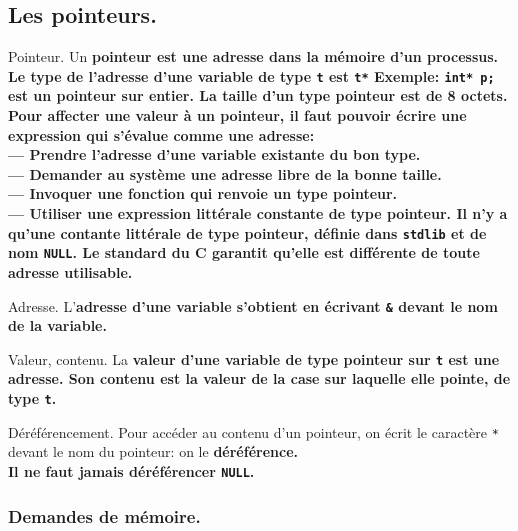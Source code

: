 \documentclass[french, 11pt]{article}
\begin{document}
\subsection{Les pointeurs.}

\begin{defi}{Pointeur.}{}
    Un \bf{pointeur} est une adresse dans la mémoire d'un processus.\\
    Le type de l'adresse d'une variable de type \texttt{t} est \texttt{t*}\n
    \bf{Exemple:} \texttt{int* p;} est un pointeur sur entier.\n
    La taille d'un type pointeur est de 8 octets. Pour affecter une valeur à un pointeur, il faut pouvoir écrire une expression qui s'évalue comme une adresse:\\
    --- Prendre l'adresse d'une variable existante du bon type.\\
    --- Demander au système une adresse libre de la bonne taille.\\
    --- Invoquer une fonction qui renvoie un type pointeur.\\
    --- Utiliser une expression littérale constante de type pointeur.\n
    Il n'y a qu'une contante littérale de type pointeur, définie dans \texttt{stdlib} et de nom \texttt{NULL}. Le standard du C garantit qu'elle est différente de toute adresse utilisable.
\end{defi}

\begin{defi}{Adresse.}{}
    L'\bf{adresse} d'une variable s'obtient en écrivant \texttt{\&} devant le nom de la variable. 
\end{defi}

\begin{defi}{Valeur, contenu.}{}
    La \bf{valeur} d'une variable de type pointeur sur \texttt{t} est une adresse. Son \bf{contenu} est la valeur de la case sur laquelle elle pointe, de type \texttt{t}.
\end{defi}

\begin{defi}{Déréférencement.}{}
    Pour accéder au contenu d'un pointeur, on écrit le caractère \texttt{*} devant le nom du pointeur: on le \bf{déréférence}.\\
    Il ne faut jamais déréférencer \texttt{NULL}. 
\end{defi}

\subsubsection{Demandes de mémoire.}
\end{document}
